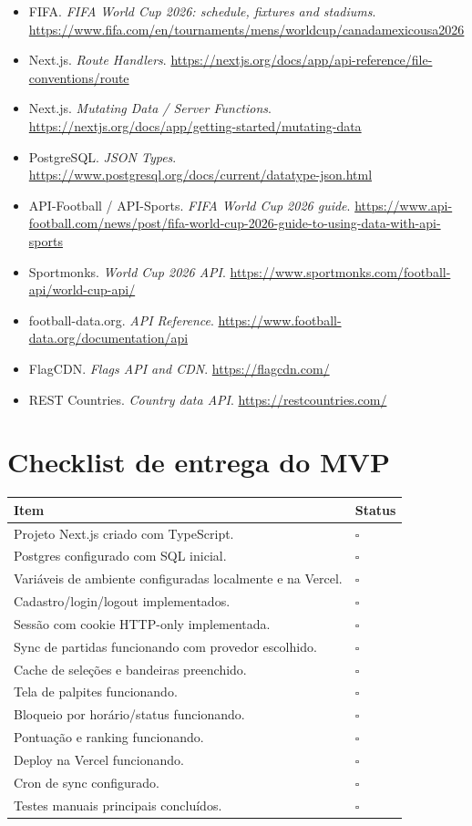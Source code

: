 \documentclass[12pt,a4paper]{article}
\begin{document}
\begin{itemize}
  \item FIFA. \textit{FIFA World Cup 2026: schedule, fixtures and stadiums}. \url{https://www.fifa.com/en/tournaments/mens/worldcup/canadamexicousa2026}
  \item Next.js. \textit{Route Handlers}. \url{https://nextjs.org/docs/app/api-reference/file-conventions/route}
  \item Next.js. \textit{Mutating Data / Server Functions}. \url{https://nextjs.org/docs/app/getting-started/mutating-data}
  \item PostgreSQL. \textit{JSON Types}. \url{https://www.postgresql.org/docs/current/datatype-json.html}
  \item API-Football / API-Sports. \textit{FIFA World Cup 2026 guide}. \url{https://www.api-football.com/news/post/fifa-world-cup-2026-guide-to-using-data-with-api-sports}
  \item Sportmonks. \textit{World Cup 2026 API}. \url{https://www.sportmonks.com/football-api/world-cup-api/}
  \item football-data.org. \textit{API Reference}. \url{https://www.football-data.org/documentation/api}
  \item FlagCDN. \textit{Flags API and CDN}. \url{https://flagcdn.com/}
  \item REST Countries. \textit{Country data API}. \url{https://restcountries.com/}
\end{itemize}

\appendix
\section{Checklist de entrega do MVP}

\begin{longtable}{p{}p{}}
\toprule
\textbf{Item} & \textbf{Status} \\
\midrule
Projeto Next.js criado com TypeScript. & \(\square\) \\
Postgres configurado com SQL inicial. & \(\square\) \\
Variáveis de ambiente configuradas localmente e na Vercel. & \(\square\) \\
Cadastro/login/logout implementados. & \(\square\) \\
Sessão com cookie HTTP-only implementada. & \(\square\) \\
Sync de partidas funcionando com provedor escolhido. & \(\square\) \\
Cache de seleções e bandeiras preenchido. & \(\square\) \\
Tela de palpites funcionando. & \(\square\) \\
Bloqueio por horário/status funcionando. & \(\square\) \\
Pontuação e ranking funcionando. & \(\square\) \\
Deploy na Vercel funcionando. & \(\square\) \\
Cron de sync configurado. & \(\square\) \\
Testes manuais principais concluídos. & \(\square\) \\
\bottomrule
\end{longtable}
\end{document}
